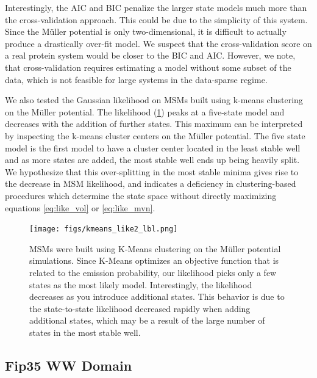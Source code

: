 \documentclass[twocolumn,floatfix,nofootinbib,aps]{revtex4-1}
\begin{document}
Interestingly, the AIC and BIC penalize the larger state models much more than the cross-validation approach. This could be due to the simplicity of this system. Since the M\"uller potential is only two-dimensional, it is difficult to actually produce a drastically over-fit model. We suspect that the cross-validation score on a real protein system would be closer to the BIC and AIC. However, we note, that cross-validation requires estimating a model without some subset of the data, which is not feasible for large systems in the data-sparse regime.

We also tested the Gaussian likelihood on MSMs built using k-means clustering on the M\"uller potential. The likelihood (\cref{fig:kmeans_mull}) peaks at a five-state model and decreases with the addition of further states. This maximum can be interpreted by inspecting the k-means cluster centers on the M\"uller potential. The five state model is the first model to have a cluster center located in the least stable well and as more states are added, the most stable well ends up being heavily split. We hypothesize that this over-splitting in the most stable minima gives rise to the decrease in MSM likelihood, and indicates a deficiency in clustering-based procedures which determine the state space without directly maximizing equations \ref{eq:like_vol} or \ref{eq:like_mvn}.

\begin{figure}
\centering
\texttt{[image: figs/kmeans\_like2\_lbl.png]}
\caption{MSMs were built using K-Means clustering on the M\"uller potential simulations. Since K-Means optimizes an objective function that is related to the emission probability, our likelihood picks only a few states as the most likely model. Interestingly, the likelihood decreases as you introduce additional states. This behavior is due to the state-to-state likelihood decreased rapidly when adding additional states, which may be a result of the large number of states in the most stable well.}
\label{fig:kmeans_mull}
\end{figure}

\subsection{Fip35 WW Domain}
\end{document}
